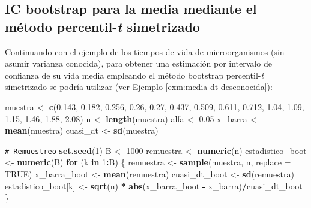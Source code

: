 \documentclass[
]{book}
\newenvironment{Shaded}{\begin{snugshade}}{\end{snugshade}}
\newcommand{\AttributeTok}[1]{\textcolor[rgb]{0.13,0.29,0.53}{#1}}
\newcommand{\CommentTok}[1]{\textcolor[rgb]{0.56,0.35,0.01}{\textit{#1}}}
\newcommand{\ConstantTok}[1]{\textcolor[rgb]{0.56,0.35,0.01}{#1}}
\newcommand{\ControlFlowTok}[1]{\textcolor[rgb]{0.13,0.29,0.53}{\textbf{#1}}}
\newcommand{\DecValTok}[1]{\textcolor[rgb]{0.00,0.00,0.81}{#1}}
\newcommand{\FloatTok}[1]{\textcolor[rgb]{0.00,0.00,0.81}{#1}}
\newcommand{\FunctionTok}[1]{\textcolor[rgb]{0.13,0.29,0.53}{\textbf{#1}}}
\newcommand{\NormalTok}[1]{#1}
\newcommand{\OtherTok}[1]{\textcolor[rgb]{0.56,0.35,0.01}{#1}}
\newcommand{\SpecialCharTok}[1]{\textcolor[rgb]{0.81,0.36,0.00}{\textbf{#1}}}
\theoremstyle{break}
\theoremstyle{nonumberplain}
\renewcommand{\CommentTok}[1]{\textcolor[rgb]{0.41,0.41,0.41}{\texttt{#1}}}
\begin{document}
\subsection{\texorpdfstring{IC bootstrap para la media mediante el método percentil-\emph{t} simetrizado}{IC bootstrap para la media mediante el método percentil-t simetrizado}}\label{media-dt-desconocida-persim}

Continuando con el ejemplo de los tiempos de vida de microorganismos
(sin asumir varianza conocida),
para obtener una estimación por intervalo de confianza
de su vida media empleando el método bootstrap percentil-\emph{t} simetrizado
se podría utilizar (ver Ejemplo \ref{exm:media-dt-desconocida}):

\begin{Shaded}
\begin{Highlighting}[]
\NormalTok{muestra }\OtherTok{\textless{}{-}} \FunctionTok{c}\NormalTok{(}\FloatTok{0.143}\NormalTok{, }\FloatTok{0.182}\NormalTok{, }\FloatTok{0.256}\NormalTok{, }\FloatTok{0.26}\NormalTok{, }\FloatTok{0.27}\NormalTok{, }\FloatTok{0.437}\NormalTok{, }\FloatTok{0.509}\NormalTok{, }
             \FloatTok{0.611}\NormalTok{, }\FloatTok{0.712}\NormalTok{, }\FloatTok{1.04}\NormalTok{, }\FloatTok{1.09}\NormalTok{, }\FloatTok{1.15}\NormalTok{, }\FloatTok{1.46}\NormalTok{, }\FloatTok{1.88}\NormalTok{, }\FloatTok{2.08}\NormalTok{)}
\NormalTok{n }\OtherTok{\textless{}{-}} \FunctionTok{length}\NormalTok{(muestra)}
\NormalTok{alfa }\OtherTok{\textless{}{-}} \FloatTok{0.05}
\NormalTok{x\_barra }\OtherTok{\textless{}{-}} \FunctionTok{mean}\NormalTok{(muestra)}
\NormalTok{cuasi\_dt }\OtherTok{\textless{}{-}} \FunctionTok{sd}\NormalTok{(muestra)}

\CommentTok{\# Remuestreo}
\FunctionTok{set.seed}\NormalTok{(}\DecValTok{1}\NormalTok{)}
\NormalTok{B }\OtherTok{\textless{}{-}} \DecValTok{1000}
\NormalTok{remuestra }\OtherTok{\textless{}{-}} \FunctionTok{numeric}\NormalTok{(n)}
\NormalTok{estadistico\_boot }\OtherTok{\textless{}{-}} \FunctionTok{numeric}\NormalTok{(B)}
\ControlFlowTok{for}\NormalTok{ (k }\ControlFlowTok{in} \DecValTok{1}\SpecialCharTok{:}\NormalTok{B) \{}
\NormalTok{  remuestra }\OtherTok{\textless{}{-}} \FunctionTok{sample}\NormalTok{(muestra, n, }\AttributeTok{replace =} \ConstantTok{TRUE}\NormalTok{)}
\NormalTok{  x\_barra\_boot }\OtherTok{\textless{}{-}} \FunctionTok{mean}\NormalTok{(remuestra)}
\NormalTok{  cuasi\_dt\_boot }\OtherTok{\textless{}{-}} \FunctionTok{sd}\NormalTok{(remuestra)}
\NormalTok{  estadistico\_boot[k] }\OtherTok{\textless{}{-}} \FunctionTok{sqrt}\NormalTok{(n) }\SpecialCharTok{*} \FunctionTok{abs}\NormalTok{(x\_barra\_boot }\SpecialCharTok{{-}}\NormalTok{ x\_barra)}\SpecialCharTok{/}\NormalTok{cuasi\_dt\_boot}
\NormalTok{\}}


\end{Highlighting}
\end{Shaded}
\end{document}
